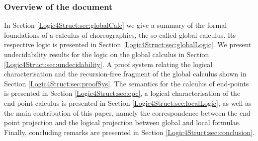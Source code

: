 \subsubsection{Overview of the document}

In Section \ref{Logic4Struct:sec:globalCalc} we give a summary of the
formal foundations of a calculus of choreographies, the so-called
global calculus. Its respective logic is presented in Section
\ref{Logic4Struct:sec:globalLogic}. We present undecidability results
for the logic on the global calculus in Section
\ref{Logic4Struct:sec:undecidability}. A proof
system relating the logical characterisation and the recursion-free
fragment of the global calculus shown in Section
\ref{Logic4Struct:sec:proofSys}. The semantics for the calculus of
end-points is presented in Section \ref{Logic4Struct:sec:epc}, a
logical characterisation of the end-point calculus is presented in
Section \ref{Logic4Struct:sec:localLogic}, as well as the main
contribution of this paper, namely the correspondence between the
end-point projection and the logical projection between global and
local formulae. Finally, concluding remarks are presented in Section
\ref{Logic4Struct:sec:conclusion}.


 
 


